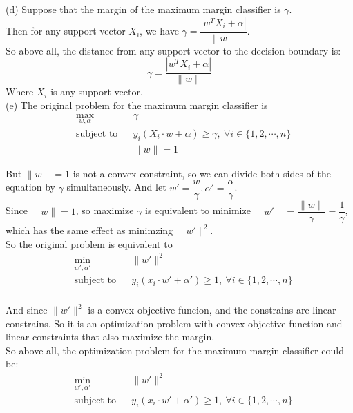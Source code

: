 \documentclass[10pt]{article}
\begin{document}
\begin{enumerate}[1.]
(d) Suppose that the margin of the maximum margin classifier is $\gamma$.\\
Then for any support vector $X_i$, we have $\gamma = \dfrac{|w^TX_i + \alpha|}{\|w\|}$.\\
So above all, the distance from any support vector to the decision boundary is:
$$\gamma = \dfrac{|w^TX_i + \alpha|}{\|w\|}$$
Where $X_i$ is any support vector.\\

(e) The original problem for the maximum margin classifier is
\begin{equation}
  \begin{aligned}
    & \max_{w,\alpha}
    & & \gamma \\
    & \text{subject to}
    & & y_i(X_i\cdot w+\alpha)\geq \gamma,\ \forall i\in\{1,2,\cdots,n\} \\
    & & & \|w\|=1
  \end{aligned}
\end{equation}

But $\|w\|=1$ is not a convex constraint, so we can divide both sides of the equation by $\gamma$ simultaneously.
And let $w'=\dfrac{w}{\gamma}, \alpha'=\dfrac{\alpha}{\gamma}$.\\
Since $\|w\|=1$, so maximize $\gamma$ is equivalent to minimize $\|w'\|=\dfrac{\|w\|}{\gamma}=\dfrac{1}{\gamma}$, which has the same 
effect as minimzing $\|w'\|^2$.\\ 
So the original problem is equivalent to
\begin{equation}
  \begin{aligned}
    & \min_{w',\alpha'}
    & & \|w'\|^2 \\
    & \text{subject to}
    & & y_i(x_i\cdot w'+\alpha')\geq 1,\ \forall i\in\{1,2,\cdots,n\} \\
  \end{aligned}
\end{equation}

And since $\|w'\|^2$ is a convex objective funcion, and the constrains are linear constrains. So it is an optimization problem with convex objective function and linear constraints that also maximize the margin.\\
So above all, the optimization problem for the maximum margin classifier could be:
\begin{equation}
  \begin{aligned}
    & \min_{w',\alpha'}
    & & \|w'\|^2 \\
    & \text{subject to}
    & & y_i(x_i\cdot w'+\alpha')\geq 1,\ \forall i\in\{1,2,\cdots,n\} \\
  \end{aligned}
\end{equation}


\end{enumerate}
\end{document}
